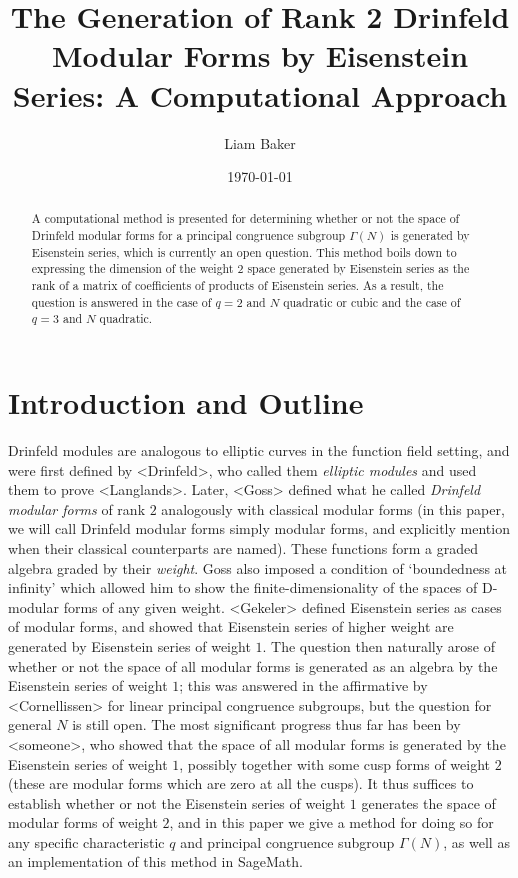 \documentclass{article}
\title{The Generation of Rank 2 Drinfeld Modular Forms by Eisenstein Series: A Computational Approach}
\author{Liam Baker}
\date{\today}
\begin{document}
 \maketitle

\begin{abstract}
  A computational method is presented for determining whether or not the space of Drinfeld modular forms for a principal congruence subgroup $\Gamma(N)$ is generated by Eisenstein series, which is currently an open question.
  This method boils down to expressing the dimension of the weight $2$ space generated by Eisenstein series as the rank of a matrix of coefficients of products of Eisenstein series.
  As a result, the question is answered in the case of $q = 2$ and $N$ quadratic or cubic and the case of $q = 3$ and $N$ quadratic.
\end{abstract}


\section{Introduction and Outline}

Drinfeld modules are analogous to elliptic curves in the function field setting, and were first defined by <Drinfeld>, who called them \emph{elliptic modules} and used them to prove <Langlands>.
Later, <Goss> defined what he called \emph{Drinfeld modular forms} of rank $2$ analogously with classical modular forms (in this paper, we will call Drinfeld modular forms simply modular forms, and explicitly mention when their classical counterparts are named).
These functions form a graded algebra graded by their \emph{weight}.
Goss also imposed a condition of `boundedness at infinity' which allowed him to show the finite-dimensionality of the spaces of D-modular forms of any given weight.
<Gekeler> defined Eisenstein series as cases of modular forms, and showed that Eisenstein series of higher weight are generated by Eisenstein series of weight $1$.
The question then naturally arose of whether or not the space of all modular forms is generated as an algebra by the Eisenstein series of weight $1$; this was answered in the affirmative by <Cornellissen> for linear principal congruence subgroups, but the question for general $N$ is still open.
The most significant progress thus far has been by <someone>, who showed that the space of all modular forms is generated by the Eisenstein series of weight $1$, possibly together with some cusp forms of weight $2$ (these are modular forms which are zero at all the cusps).
It thus suffices to establish whether or not the Eisenstein series of weight $1$ generates the space of modular forms of weight $2$, and in this paper we give a method for doing so for any specific characteristic $q$ and principal congruence subgroup $\Gamma(N)$, as well as an implementation of this method in SageMath.
\end{document}
